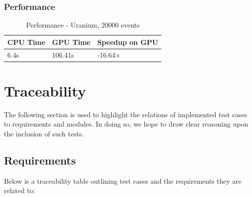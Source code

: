 \documentclass[12pt]{article}
\begin{document}
	\subsubsection{Performance}
		\begin{table}[H]
		\centering
		\caption{Performance - Uranium, 20000 events}\label{sys5Perf}
		\begin{tabular}{lll}
		\toprule
		CPU Time& GPU Time&Speedup on GPU\\\midrule
		6.4s&106.41s&-16.64$\times$\\\bottomrule
		\end{tabular}
		\end{table}		

\section{Traceability}
The following section is used to highlight the relations of implemented test cases to requirements and modules. In doing so, we hope to draw clear reasoning upon the inclusion of such tests. 
\subsection{Requirements}
Below is a traceability table outlining test cases and the requirements they are related to:\\
\end{document}

